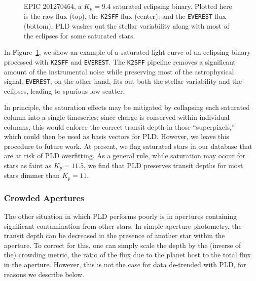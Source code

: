 \documentclass[]{emulateapj}
\begin{document}
\begin{figure}[h]
  \begin{center}
       \caption{EPIC 201270464, a $K_p = 9.4$ saturated eclipsing binary. Plotted here
                is the raw flux (top), the \texttt{K2SFF} flux (center), and the \texttt{EVEREST}
                flux (bottom). PLD washes out the stellar variability along with most of the eclipses
                for some saturated stars.}
     \label{fig:201270464}
  \end{center}
\end{figure}

In Figure~\ref{fig:201270464}, we show an example of a saturated light curve of an eclipsing
binary processed with \texttt{K2SFF} and \texttt{EVEREST}. The \texttt{K2SFF} pipeline removes
a significant amount of the instrumental noise while preserving most of the astrophysical signal.
\texttt{EVEREST}, on the other hand, fits out both the stellar variability and the eclipses,
leading to spurious low scatter.

In principle, the saturation effects may be mitigated by collapsing each saturated column
into a single timeseries; since charge is conserved within individual columns, this would enforce
the correct transit depth in those ``superpixels,'' which could then be used as basis
vectors for PLD. However, we leave this procedure to future work. At present, we flag
saturated stars in our database that are at risk of PLD overfitting. As a general rule, 
while saturation may occur for stars as faint as $K_p = 11.5$, we find that PLD preserves transit
depths for most stars dimmer than $K_p = 11$.

\subsubsection{Crowded Apertures}
\label{sec:crowded}
The other situation in which PLD performs poorly is in apertures containing significant
contamination from other stars. In simple aperture photometry, the transit depth
can be decreased in the presence of another star within the aperture. To correct for 
this, one can simply scale the depth by the (inverse of the) crowding metric, the ratio of 
the flux due to the planet host to the total flux in the aperture. However, this is not
the case for data de-trended with PLD, for reasons we describe below.
\end{document}
